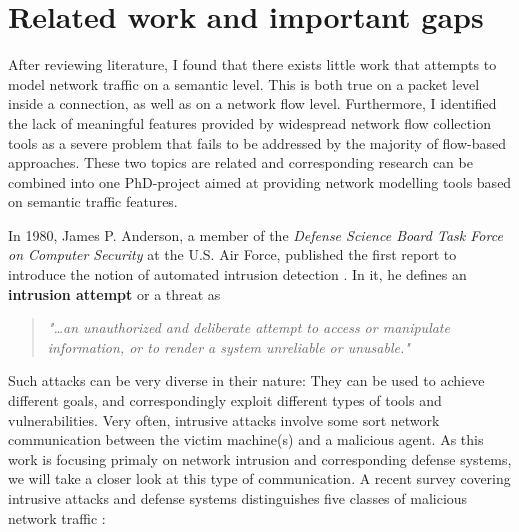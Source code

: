 \documentclass[a4paper,12pt,twoside]{report}
\begin{document}
\section{Related work and important gaps}


After reviewing literature, I found that there exists little work that attempts to model network traffic on a semantic level. This is both true on a packet level inside a connection, as well as on a network flow level. Furthermore, I identified the lack of meaningful features provided by widespread network flow collection tools as a severe problem that fails to be addressed by the majority of flow-based approaches. These two topics are related and corresponding research can be combined into one PhD-project aimed at providing network modelling tools based on semantic traffic features.





In 1980, James P. Anderson, a member of the \textit{Defense Science Board Task Force on Computer Security} at the U.S. Air Force, published the first report to introduce the notion of automated intrusion detection \cite{anderson1980computer}. In it, he defines an \textbf{intrusion attempt} or a threat as 

\begin{quote}
\textit{"\dots an unauthorized and deliberate attempt to access or manipulate information, or to render a system unreliable or unusable."}
\end{quote}

Such attacks can be very diverse in their nature: They can be used to achieve different goals, and correspondingly exploit different types of tools and vulnerabilities. Very often, intrusive attacks involve some sort network communication between the victim machine(s) and a malicious agent. As this work is focusing primaly on network intrusion and corresponding defense systems, we will take a closer look at this type of communication. A recent survey covering intrusive attacks and defense systems distinguishes five classes of malicious network traffic \cite{nisioti2018intrusion}:
\end{document}
